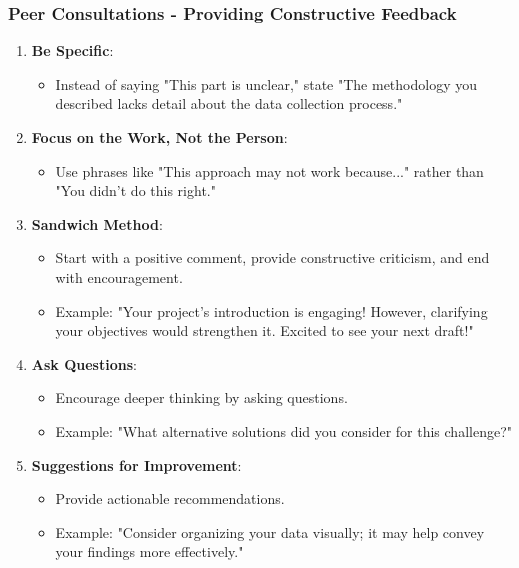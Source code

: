\documentclass[aspectratio=169]{beamer}
\begin{document}
\begin{frame}[fragile]
    \frametitle{Peer Consultations - Providing Constructive Feedback}
    
    \begin{enumerate}
        \item \textbf{Be Specific}: 
            \begin{itemize}
                \item Instead of saying "This part is unclear," state "The methodology you described lacks detail about the data collection process."
            \end{itemize}
        \item \textbf{Focus on the Work, Not the Person}:
            \begin{itemize}
                \item Use phrases like "This approach may not work because..." rather than "You didn’t do this right."
            \end{itemize}
        \item \textbf{Sandwich Method}: 
            \begin{itemize}
                \item Start with a positive comment, provide constructive criticism, and end with encouragement. 
                \item Example: "Your project's introduction is engaging! However, clarifying your objectives would strengthen it. Excited to see your next draft!"
            \end{itemize}
        \item \textbf{Ask Questions}:
            \begin{itemize}
                \item Encourage deeper thinking by asking questions. 
                \item Example: "What alternative solutions did you consider for this challenge?"
            \end{itemize}
        \item \textbf{Suggestions for Improvement}:
            \begin{itemize}
                \item Provide actionable recommendations. 
                \item Example: "Consider organizing your data visually; it may help convey your findings more effectively."
            \end{itemize}
    \end{enumerate}
\end{frame}
\end{document}
